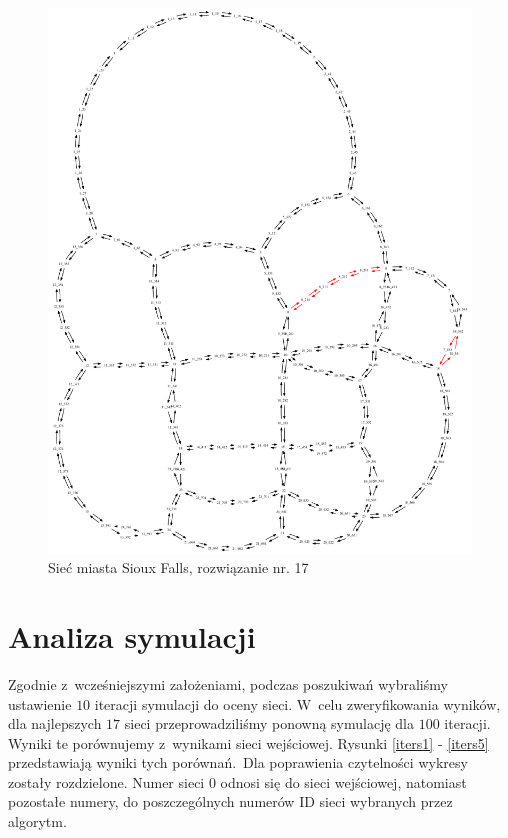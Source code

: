 \documentclass[twoside,12pt]{report}
\begin{document}
\begin{figure}[ht]
\centering
\includegraphics[totalheight=0.580\textheight, angle=90]{img/sioux-out/17/network2}
\caption{Sieć miasta Sioux Falls, rozwiązanie nr. 17}
\label{sioux17}
\end{figure}

\clearpage
\section{Analiza symulacji}

Zgodnie z~wcześniejszymi założeniami, podczas poszukiwań wybraliśmy ustawienie $10$ iteracji symulacji do oceny sieci. W~celu zweryfikowania wyników, dla najlepszych $17$ sieci przeprowadziliśmy ponowną symulację dla $100$ iteracji. Wyniki te porównujemy z~wynikami sieci wejściowej. Rysunki \ref{iters1} - \ref{iters5} przedstawiają wyniki tych porównań.~Dla poprawienia czytelności wykresy zostały rozdzielone. Numer sieci $0$ odnosi się do sieci wejściowej, natomiast pozostałe numery, do poszczególnych numerów ID sieci wybranych przez algorytm.
\end{document}

